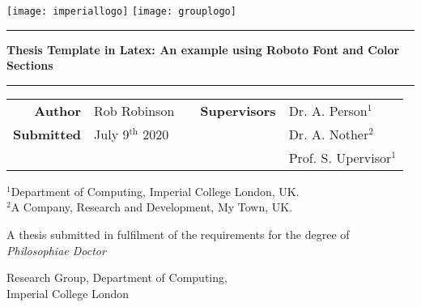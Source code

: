 \begin{titlepage}
\centering
        \texttt{[image: imperiallogo]}
          \hfill
        \texttt{[image: grouplogo]}
 
 		\vfill
        
		\rule{\linewidth}{0.5mm}
		\vspace{0.01cm}
		
        \raggedright
        {\fontsize{26pt}{26pt}\selectfont\bfseries{Thesis Template in Latex: An example using Roboto Font and Color Sections}}

        \vspace{0.01cm}
		\rule{\linewidth}{0.5mm}
        
        \vspace{0.5cm}
        
        \renewcommand{\arraystretch}{1.4}
            \begin{originaltable}[!h]
            {\fontsize{13pt}{13pt}\selectfont
                \begin{tabularx}{\linewidth}{r l p{2.0cm} r l}
                
                \textbf{Author} & Rob Robinson & & \textbf{Supervisors} & Dr. A. Person$^{1}$\\
                \textbf{Submitted} & July 9$^{\text{th}}$ 2020 &&& Dr. A. Nother$^{2}$\\
                &&&& Prof. S. Upervisor$^{1}$
        		\end{tabularx}
            }
            \end{originaltable}
		\renewcommand{\arraystretch}{0.8}

        \raggedright
        \vspace{0.5cm}
        
        $^{1}$Department of Computing, Imperial College London, UK.\\
        $^{2}$A Company, Research and Development, My Town, UK.
        
        \vfill
        
        \centering

        
        A thesis submitted in fulfilment of the requirements for the degree of \textit{Philosophiae Doctor}
        
		\vspace{.5cm}
        {\fontsize{14pt}{14pt}\selectfont Research Group, Department of Computing,\\\vspace{0.2cm}
        \Large Imperial College London}
        
        \vspace{1cm}
        
\end{titlepage}